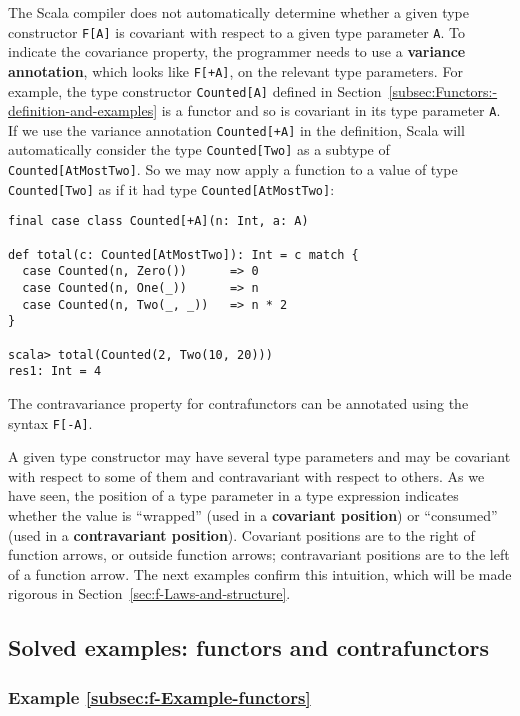 The Scala compiler does not automatically determine whether a given
type constructor \lstinline!F[A]! is covariant with respect to a
given type parameter \lstinline!A!. To indicate the covariance property,
the programmer needs to use a \textbf{variance
annotation}, which looks like \lstinline!F[+A]!, on the relevant
type parameters. For example, the type constructor \lstinline!Counted[A]!
defined in Section~\ref{subsec:Functors:-definition-and-examples}
is a functor and so is covariant in its type parameter \lstinline!A!.
If we use the variance annotation \lstinline!Counted[+A]! in the
definition, Scala will automatically consider the type \lstinline!Counted[Two]!
as a subtype of \lstinline!Counted[AtMostTwo]!. So we may now apply
a function to a value of type \lstinline!Counted[Two]! as if it had
type \lstinline!Counted[AtMostTwo]!:
\begin{lstlisting}
final case class Counted[+A](n: Int, a: A)

def total(c: Counted[AtMostTwo]): Int = c match {
  case Counted(n, Zero())      => 0
  case Counted(n, One(_))      => n
  case Counted(n, Two(_, _))   => n * 2
}

scala> total(Counted(2, Two(10, 20)))
res1: Int = 4
\end{lstlisting}

The contravariance property for contrafunctors can be annotated using
the syntax \lstinline!F[-A]!.

A given type constructor may have several type parameters and may
be covariant with respect to some of them and contravariant with respect
to others. As we have seen, the position of a type parameter in a
type expression indicates whether the value is ``wrapped'' (used
in a \textbf{covariant position}) or ``consumed''
(used in a \textbf{contravariant position}).
Covariant positions are to the right of function arrows, or outside
function arrows; contravariant positions are to the left of a function
arrow. The next examples confirm this intuition, which will be made
rigorous in Section~\ref{sec:f-Laws-and-structure}.

\subsection{Solved examples: functors and contrafunctors}

\subsubsection{Example \label{subsec:f-Example-functors}\ref{subsec:f-Example-functors}}


